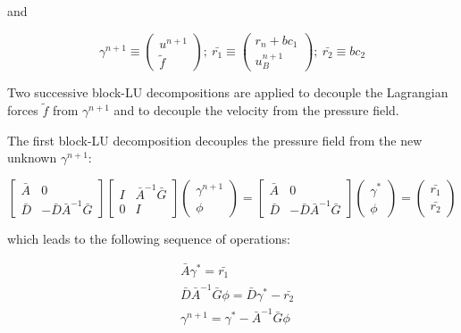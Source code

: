 and

\begin{equation*}
\gamma^{n+1} \equiv \left( \begin{matrix} u^{n+1} \\ \tilde{f} \end{matrix}\right) ;\
\bar{r_1} \equiv \left( \begin{matrix} r_n + bc_1 \\ u_B^{n+1} \end{matrix}\right) ;\
\bar{r_2} \equiv bc_2
\end{equation*}

Two successive block-LU decompositions are applied to decouple the Lagrangian forces $\tilde{f}$ from $\gamma^{n+1}$ and to decouple the velocity from the pressure field.

The first block-LU decomposition decouples the pressure field from the new unknown $\gamma^{n+1}$:

\begin{equation}
\left[
\begin{matrix}
\bar{A} & 0 \\
\bar{D} & -\bar{D}\bar{A}^{-1}\bar{G}
\end{matrix}
\right]
\left[
\begin{matrix}
I & \bar{A}^{-1}\bar{G} \\
0 & I
\end{matrix}
\right]
\left(
\begin{matrix}
\gamma^{n+1} \\
\phi
\end{matrix}
\right)
=
\left[
\begin{matrix}
\bar{A} & 0 \\
\bar{D} & -\bar{D}\bar{A}^{-1}\bar{G}
\end{matrix}
\right]
\left(
\begin{matrix}
\gamma^* \\
\phi
\end{matrix}
\right)
=
\left(
\begin{matrix}
\bar{r_1} \\
\bar{r_2}
\end{matrix}
\right)
\end{equation}

which leads to the following sequence of operations:

\begin{align}
& \bar{A} \gamma^* = \bar{r_1} \\
& \bar{D}\bar{A}^{-1}\bar{G} \phi = \bar{D} \gamma^* - \bar{r_2} \\
& \gamma^{n+1} = \gamma^* - \bar{A}^{-1}\bar{G} \phi
\end{align}

